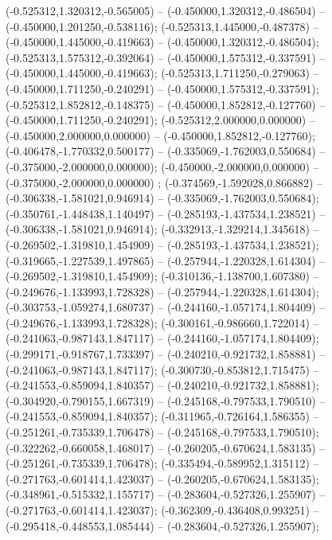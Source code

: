  (-0.525312,1.320312,-0.565005) -- (-0.450000,1.320312,-0.486504) -- (-0.450000,1.201250,-0.538116);
 (-0.525313,1.445000,-0.487378) -- (-0.450000,1.445000,-0.419663) -- (-0.450000,1.320312,-0.486504);
 (-0.525313,1.575312,-0.392064) -- (-0.450000,1.575312,-0.337591) -- (-0.450000,1.445000,-0.419663);
 (-0.525313,1.711250,-0.279063) -- (-0.450000,1.711250,-0.240291) -- (-0.450000,1.575312,-0.337591);
 (-0.525312,1.852812,-0.148375) -- (-0.450000,1.852812,-0.127760) -- (-0.450000,1.711250,-0.240291);
 (-0.525312,2.000000,0.000000) -- (-0.450000,2.000000,0.000000) -- (-0.450000,1.852812,-0.127760);
 (-0.406478,-1.770332,0.500177) -- (-0.335069,-1.762003,0.550684) -- (-0.375000,-2.000000,0.000000);
 (-0.450000,-2.000000,0.000000) -- (-0.375000,-2.000000,0.000000) ;
 (-0.374569,-1.592028,0.866882) -- (-0.306338,-1.581021,0.946914) -- (-0.335069,-1.762003,0.550684);
 (-0.350761,-1.448438,1.140497) -- (-0.285193,-1.437534,1.238521) -- (-0.306338,-1.581021,0.946914);
 (-0.332913,-1.329214,1.345618) -- (-0.269502,-1.319810,1.454909) -- (-0.285193,-1.437534,1.238521);
 (-0.319665,-1.227539,1.497865) -- (-0.257944,-1.220328,1.614304) -- (-0.269502,-1.319810,1.454909);
 (-0.310136,-1.138700,1.607380) -- (-0.249676,-1.133993,1.728328) -- (-0.257944,-1.220328,1.614304);
 (-0.303753,-1.059274,1.680737) -- (-0.244160,-1.057174,1.804409) -- (-0.249676,-1.133993,1.728328);
 (-0.300161,-0.986660,1.722014) -- (-0.241063,-0.987143,1.847117) -- (-0.244160,-1.057174,1.804409);
 (-0.299171,-0.918767,1.733397) -- (-0.240210,-0.921732,1.858881) -- (-0.241063,-0.987143,1.847117);
 (-0.300730,-0.853812,1.715475) -- (-0.241553,-0.859094,1.840357) -- (-0.240210,-0.921732,1.858881);
 (-0.304920,-0.790155,1.667319) -- (-0.245168,-0.797533,1.790510) -- (-0.241553,-0.859094,1.840357);
 (-0.311965,-0.726164,1.586355) -- (-0.251261,-0.735339,1.706478) -- (-0.245168,-0.797533,1.790510);
 (-0.322262,-0.660058,1.468017) -- (-0.260205,-0.670624,1.583135) -- (-0.251261,-0.735339,1.706478);
 (-0.335494,-0.589952,1.315112) -- (-0.271763,-0.601414,1.423037) -- (-0.260205,-0.670624,1.583135);
 (-0.348961,-0.515332,1.155717) -- (-0.283604,-0.527326,1.255907) -- (-0.271763,-0.601414,1.423037);
 (-0.362309,-0.436408,0.993251) -- (-0.295418,-0.448553,1.085444) -- (-0.283604,-0.527326,1.255907);
